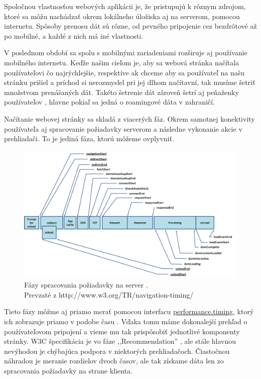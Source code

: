 Spoločnou vlastnosťou webových aplikácii je, že pristupujú k rôznym zdrojom, ktoré sa môžu nachádzať okrem lokálneho úložiska aj na serverom, pomocou internetu. Spôsoby prenosu dát sú rôzne, od pevného pripojenie cez bezdrôtové až po mobilné, a každé z nich má iné vlastnosti.

V poslednom období sa spolu s mobilnými zariadeniami rozširuje aj používanie mobilného internetu. Keďže našim cieľom je, aby sa webová stránka načítala používateľovi čo najrýchlejšie, respektíve ak chceme aby sa používateľ na našu stránku prišiel a príchod si nerozmyslel pri jej dlhom načítavní, tak musíme šetriť množstvom prenášaných dát. Takéto šetrenie dát zároveň šetrí aj peňaženky používateľov \cite{performance}, hlavne pokiaľ sa jedná o roamingové dáta v zahraničí.

Načítanie webovej stránky sa skladá z viacerých fáz. Okrem samotnej konektivity používateľa aj spracovanie požiadavky serverom a následne vykonanie akcie v prehliadači. To je jediná fáza, ktorú môžeme ovplyvniť.

\begin{figure}[H]
	\centering
	\includegraphics[width=1.0\textwidth]{img/w3c-timing-overview.png}
	\caption[Fázy spracovania požiadavky na server]{
		Fázy spracovania požiadavky na server \cite{timing}.\\
		Prevzaté z http://www.w3.org/TR/navigation-timing/}
	\label{fig: timing}
\end{figure}

Tieto fázy môžme aj priamo merať pomocou interfacu \url{performance.timing}, ktorý ich zobrazuje priamo v podobe času \cite{1000ms, performancebrowsernetworking}. Vďaka tomu máme dokonalejší prehľad o používateľovom pripojení a vieme mu tak prispôsobiť jednotlivé komponenty stránky. W3C špecifikácia je vo fáze ,,Recommendation'' \cite{timing}, ale stále hlavnou nevýhodou je chýbajúca podpora v niektorých prehliadačoch. Čiastočnou náhradou je meranie rozdielov dvoch časov, ale tak získame dáta len zo spracovania požiadavky na strane klienta.

